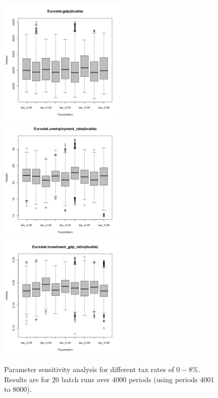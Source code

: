 \begin{figure}[ht!]
\centering\leavevmode
\begin{minipage}{7.5cm}
\centering\leavevmode
\includegraphics[width=6cm]{./batch/Eurostat-gdp-scenarios.png}\\
\includegraphics[width=6cm]{./batch/Eurostat-unemployment_rate-scenarios.png}\\
\includegraphics[width=6cm]{./batch/Eurostat-investment_gdp_ratio-scenarios.png}
\end{minipage}
\caption{Parameter sensitivity analysis for different tax rates of $0-8\%$. Results are for $20$ batch runs over $4000$ periods (using periods $4001$ to $8000$).}
\label{Figure: scenarios}
\end{figure}
